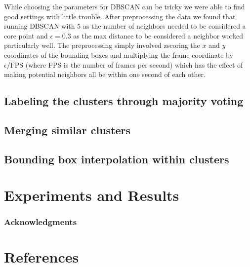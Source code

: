 \documentclass{article}
\begin{document}
While choosing the parameters for DBSCAN can be tricky we were able to find good settings with little trouble. 
After preprocessing the data we found that running DBSCAN with 5 as the number of neighbors needed to be considered a core point and $\epsilon=0.3$ as 
the max distance to be considered a neighbor worked particularly well. The preprocessing simply involved zscoring the $x$ and $y$ coordinates of the bounding boxes
and multiplying the frame coordinate by $\epsilon / \text{FPS}$ (where FPS is the number of frames per second) which has the effect of making potential neighbors all be within one 
second of each other.

\subsection{Labeling the clusters through majority voting}

\subsection{Merging similar clusters}

\subsection{Bounding box interpolation within clusters}




\section{Experiments and Results}

\subsubsection*{Acknowledgments}

\section*{References}



\end{document}
